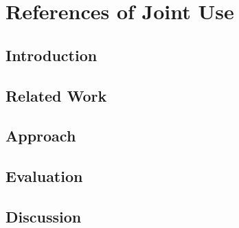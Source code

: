 \chapter{References of Joint Use}

\section{Introduction}
\Blindtext[1]

\section{Related Work}
\Blindtext[1]

\section{Approach}
\Blindtext[1]

\section{Evaluation}
\Blindtext[1]

\section{Discussion}
\Blindtext[1]
